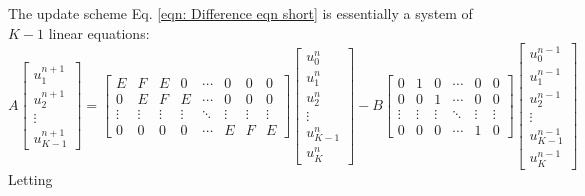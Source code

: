 \documentclass{article}
\begin{document}
The update scheme Eq. \ref{eqn: Difference eqn short} is essentially a system of $K-1$ linear equations:
\begin{equation*}
   A
   \begin{bmatrix}
      u_{1}^{n+1} \\
      u_{2}^{n+1} \\
      \vdots \\
      u_{K-1}^{n+1}
   \end{bmatrix}
   =
   \begin{bmatrix}
      E & F & E & 0 & \cdots & 0 & 0 & 0 \\
      0 & E & F & E & \cdots & 0 & 0 & 0 \\
      \vdots & \vdots & \vdots & \vdots & \ddots & \vdots & \vdots & \vdots \\
      0 & 0 & 0 & 0 & \cdots & E & F & E
   \end{bmatrix}
   \begin{bmatrix}
      u_{0}^{n} \\
      u_{1}^{n} \\
      u_{2}^{n} \\
      \vdots \\
      u_{K-1}^{n} \\
      u_{K}^{n}
   \end{bmatrix}
   - B
   \begin{bmatrix}
      0 & 1 & 0 & \cdots & 0 & 0 \\
      0 & 0 & 1 & \cdots & 0 & 0 \\
      \vdots & \vdots & \vdots & \ddots & \vdots & \vdots \\
      0 & 0 & 0 & \cdots & 1 & 0
   \end{bmatrix}
   \begin{bmatrix}
      u_{0}^{n-1} \\
      u_{1}^{n-1} \\
      u_{2}^{n-1} \\
      \vdots \\
      u_{K-1}^{n-1} \\
      u_{K}^{n-1}
   \end{bmatrix}
\end{equation*}
Letting
\end{document}
